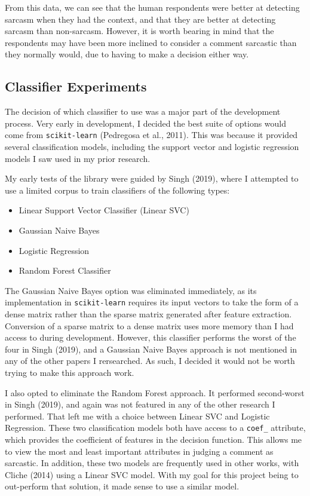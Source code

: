 \documentclass[a4paper,12pt]{article}
\begin{document}
From this data, we can see that the human respondents were better at detecting sarcasm when they had the context, and that they are better at detecting sarcasm than non-sarcasm. However, it is worth bearing in mind that the respondents may have been more inclined to consider a comment sarcastic than they normally would, due to having to make a decision either way.

\subsection{Classifier Experiments}
The decision of which classifier to use was a major part of the development process. Very early in development, I decided the best suite of options would come from \texttt{scikit-learn} (Pedregosa et al., 2011). This was because it provided several classification models, including the support vector and logistic regression models I saw used in my prior research.

My early tests of the library were guided by Singh (2019), where I attempted to use a limited corpus to train classifiers of the following types:
\begin{itemize}
  \item Linear Support Vector Classifier (Linear SVC)
  \item Gaussian Naive Bayes
  \item Logistic Regression
  \item Random Forest Classifier
\end{itemize}

The Gaussian Naive Bayes option was eliminated immediately, as its implementation in \texttt{scikit-learn} requires its input vectors to take the form of a dense matrix rather than the sparse matrix generated after feature extraction. Conversion of a sparse matrix to a dense matrix uses more memory than I had access to during development. However, this classifier performs the worst of the four in Singh (2019), and a Gaussian Naive Bayes approach is not mentioned in any of the other papers I rersearched. As such, I decided it would not be worth trying to make this approach work.

I also opted to eliminate the Random Forest approach. It performed second-worst in Singh (2019), and again was not featured in any of the other research I performed. That left me with a choice between Linear SVC and Logistic Regression. These two classification models both have access to a \texttt{coef\_} attribute, which provides the coefficient of features in the decision function. This allows me to view the most and least important attributes in judging a comment as sarcastic. In addition, these two models are frequently used in other works, with Cliche (2014) using a Linear SVC model. With my goal for this project being to out-perform that solution, it made sense to use a similar model.
\end{document}
